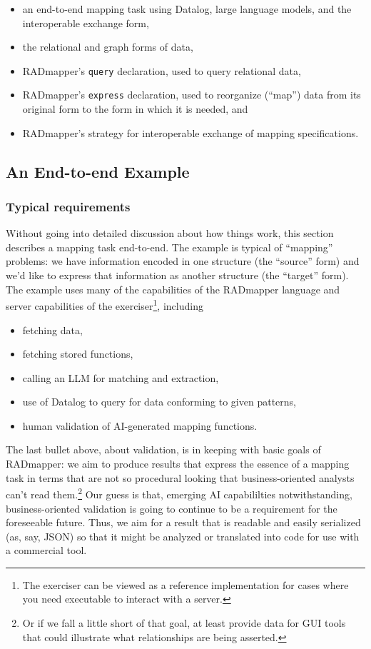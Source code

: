 \documentclass[10pt,letterpaper]{article} %
\newcommand{\stt}[1]{\texttt{#1}} %
\begin{document}
\begin{itemize}
  \item{an end-to-end mapping task using Datalog, large language models, and the interoperable exchange form,}
  \item{the relational and graph forms of data,}
  \item{RADmapper's \stt{query} declaration, used to query relational data,}
  \item{RADmapper's \stt{express} declaration, used to reorganize (``map'') data from its original form to the form in which it is needed, and}
  \item{RADmapper's strategy for interoperable exchange of mapping specifications.}
\end{itemize}

\subsection{An End-to-end Example}

\subsubsection{Typical requirements}

Without going into detailed discussion about how things work, this section describes a mapping task end-to-end.
The example is typical of ``mapping'' problems: we have information encoded in one structure (the ``source'' form) and we'd like to express that information as another structure (the ``target'' form).
The example uses many of the capabilities of the RADmapper language and server capabilities of the exerciser\footnote{The exerciser can be viewed as a reference implementation for cases where you need executable to interact with a server.}, including
\begin{itemize}
  \item{fetching data,}
  \item{fetching stored functions,}
  \item{calling an LLM for matching and extraction,}
  \item{use of Datalog to query for data conforming to given patterns,}
  \item{human validation of AI-generated mapping functions.}
  \end{itemize}

The last bullet above, about validation, is in keeping with basic goals of RADmapper: we aim to produce results that express the essence of a mapping task in terms that are not so procedural looking that business-oriented analysts can't read them.\footnote{Or if we fall a little short of that goal, at least provide data for GUI tools that could illustrate what relationships are being asserted.}
Our guess is that, emerging AI capabililties notwithstanding, business-oriented validation is going to continue to be a requirement for the foreseeable future.
Thus, we aim for a result that is readable and easily serialized (as, say, JSON) so that it might be analyzed or translated into code for use with a commercial tool.
\end{document}
